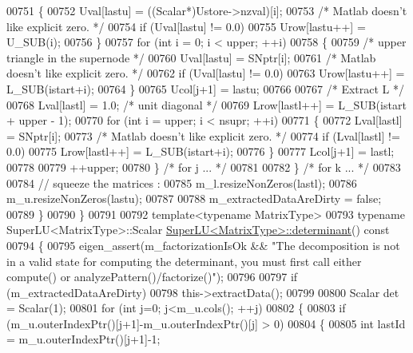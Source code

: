\begin{DoxyCode}
00751         \{
00752           Uval[lastu] = ((Scalar*)Ustore->nzval)[i];
00753           \textcolor{comment}{/* Matlab doesn't like explicit zero. */}
00754           \textcolor{keywordflow}{if} (Uval[lastu] != 0.0)
00755             Urow[lastu++] = U\_SUB(i);
00756         \}
00757         \textcolor{keywordflow}{for} (\textcolor{keywordtype}{int} i = 0; i < upper; ++i)
00758         \{
00759           \textcolor{comment}{/* upper triangle in the supernode */}
00760           Uval[lastu] = SNptr[i];
00761           \textcolor{comment}{/* Matlab doesn't like explicit zero. */}
00762           \textcolor{keywordflow}{if} (Uval[lastu] != 0.0)
00763             Urow[lastu++] = L\_SUB(istart+i);
00764         \}
00765         Ucol[j+1] = lastu;
00766 
00767         \textcolor{comment}{/* Extract L */}
00768         Lval[lastl] = 1.0; \textcolor{comment}{/* unit diagonal */}
00769         Lrow[lastl++] = L\_SUB(istart + upper - 1);
00770         \textcolor{keywordflow}{for} (\textcolor{keywordtype}{int} i = upper; i < nsupr; ++i)
00771         \{
00772           Lval[lastl] = SNptr[i];
00773           \textcolor{comment}{/* Matlab doesn't like explicit zero. */}
00774           \textcolor{keywordflow}{if} (Lval[lastl] != 0.0)
00775             Lrow[lastl++] = L\_SUB(istart+i);
00776         \}
00777         Lcol[j+1] = lastl;
00778 
00779         ++upper;
00780       \} \textcolor{comment}{/* for j ... */}
00781 
00782     \} \textcolor{comment}{/* for k ... */}
00783 
00784     \textcolor{comment}{// squeeze the matrices :}
00785     m\_l.resizeNonZeros(lastl);
00786     m\_u.resizeNonZeros(lastu);
00787 
00788     m\_extractedDataAreDirty = \textcolor{keyword}{false};
00789   \}
00790 \}
00791 
00792 \textcolor{keyword}{template}<\textcolor{keyword}{typename} MatrixType>
00793 \textcolor{keyword}{typename} SuperLU<MatrixType>::Scalar \hyperlink{class_eigen_1_1_super_l_u}{SuperLU<MatrixType>::determinant}()\textcolor{keyword}{
       const}
00794 \textcolor{keyword}{}\{
00795   eigen\_assert(m\_factorizationIsOk && \textcolor{stringliteral}{"The decomposition is not in a valid state for computing the
       determinant, you must first call either compute() or analyzePattern()/factorize()"});
00796   
00797   \textcolor{keywordflow}{if} (m\_extractedDataAreDirty)
00798     this->extractData();
00799 
00800   Scalar det = Scalar(1);
00801   \textcolor{keywordflow}{for} (\textcolor{keywordtype}{int} j=0; j<m\_u.cols(); ++j)
00802   \{
00803     \textcolor{keywordflow}{if} (m\_u.outerIndexPtr()[j+1]-m\_u.outerIndexPtr()[j] > 0)
00804     \{
00805       \textcolor{keywordtype}{int} lastId = m\_u.outerIndexPtr()[j+1]-1;

\end{DoxyCode}
